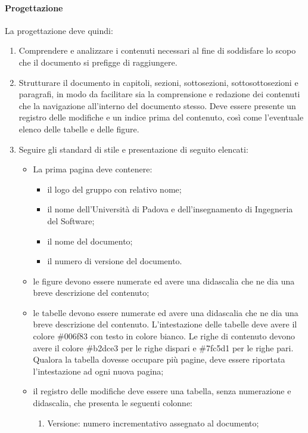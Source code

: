\paragraph{Progettazione} 
La progettazione deve quindi:
\begin{enumerate}
    \item Comprendere e analizzare i contenuti necessari al fine di soddisfare lo scopo che il documento si prefigge di raggiungere.
    \item Strutturare il documento in capitoli, sezioni, sottosezioni, sottosottosezioni e paragrafi, in modo da facilitare sia la comprensione e redazione dei contenuti che la navigazione all'interno del documento stesso. Deve essere presente un registro delle modifiche e un indice prima del contenuto, così come l'eventuale elenco delle tabelle e delle figure.
    \item Seguire gli standard di stile e presentazione di seguito elencati:
    \begin{itemize}
        \item La prima pagina deve contenere:
        \begin{itemize}
            \item il logo del gruppo con relativo nome;
            \item il nome dell'Università di Padova e dell'insegnamento di Ingegneria del Software;
            \item il nome del documento;
            \item il numero di versione del documento.
        \end{itemize}
        \item le figure devono essere numerate ed avere una didascalia che ne dia una breve descrizione del contenuto;
        \item le tabelle devono essere numerate ed avere una didascalia che ne dia una breve descrizione del contenuto. L'intestazione delle tabelle deve avere il colore \#006f83 con testo in colore bianco. Le righe di contenuto devono avere il colore \#b2dce3 per le righe dispari e \#7fc5d1 per le righe pari. Qualora la tabella dovesse occupare più pagine, deve essere riportata l'intestazione ad ogni nuova pagina;
        \item il registro delle modifiche deve essere una tabella, senza numerazione e didascalia, che presenta le seguenti colonne:
        \begin{enumerate}
            \item Versione: numero incrementativo assegnato al documento;

\end{enumerate}
\end{itemize}
\end{enumerate}
